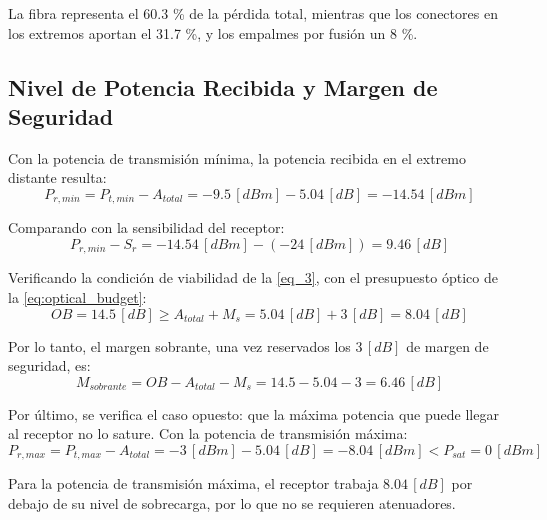 La fibra representa el 60.3 \% de la pérdida total, mientras que los conectores en los extremos aportan el 31.7 \%, y los empalmes por fusión un 8 \%.

\subsection{Nivel de Potencia Recibida y Margen de Seguridad}
\label{sec_3.3}
Con la potencia de transmisión mínima, la potencia recibida en el extremo distante resulta:
\begin{equation}
    P_{r,min} = P_{t,min} - A_{total} = -9.5 \, [dBm] - 5.04 \, [dB] = -14.54 \, [dBm]
    \label{eq_9}
\end{equation}

Comparando con la sensibilidad del receptor:
\begin{equation}
    P_{r,min} - S_{r} = -14.54 \, [dBm] - (-24 \, [dBm]) = 9.46 \, [dB]
    \label{eq_10}
\end{equation}

Verificando la condición de viabilidad de la \autoref{eq_3}, con el presupuesto óptico de la \autoref{eq:optical_budget}:
\begin{equation}
    OB = 14.5 \, [dB] \geq A_{total} + M_s = 5.04 \, [dB] + 3 \, [dB] = 8.04 \, [dB]
    \label{eq_11}
\end{equation}

Por lo tanto, el margen sobrante, una vez reservados los $3 \, [dB]$ de margen de seguridad, es:
\begin{equation}
    M_{sobrante} = OB - A_{total} - M_s = 14.5 - 5.04 - 3 = 6.46 \, [dB]
    \label{eq_12}
\end{equation}

Por último, se verifica el caso opuesto: que la máxima potencia que puede llegar al receptor no lo sature. Con la potencia de transmisión máxima:
\begin{equation}
    P_{r,max} = P_{t,max} - A_{total} = -3 \, [dBm] - 5.04 \, [dB] = -8.04 \, [dBm] < P_{sat} = 0 \, [dBm]
    \label{eq_13}
\end{equation}

Para la potencia de transmisión máxima, el receptor trabaja $8.04 \, [dB]$ por debajo de su nivel de sobrecarga, por lo que no se requieren atenuadores.


